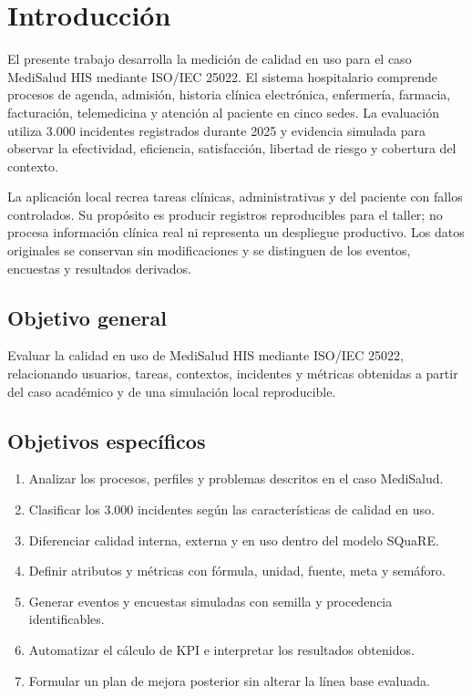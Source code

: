 \section{Introducción}

El presente trabajo desarrolla la medición de calidad en uso para el caso MediSalud HIS mediante ISO/IEC 25022. El sistema hospitalario comprende procesos de agenda, admisión, historia clínica electrónica, enfermería, farmacia, facturación, telemedicina y atención al paciente en cinco sedes. La evaluación utiliza 3.000 incidentes registrados durante 2025 y evidencia simulada para observar la efectividad, eficiencia, satisfacción, libertad de riesgo y cobertura del contexto.

La aplicación local recrea tareas clínicas, administrativas y del paciente con fallos controlados. Su propósito es producir registros reproducibles para el taller; no procesa información clínica real ni representa un despliegue productivo. Los datos originales se conservan sin modificaciones y se distinguen de los eventos, encuestas y resultados derivados.

\subsection{Objetivo general}

Evaluar la calidad en uso de MediSalud HIS mediante ISO/IEC 25022, relacionando usuarios, tareas, contextos, incidentes y métricas obtenidas a partir del caso académico y de una simulación local reproducible.

\subsection{Objetivos específicos}

\begin{enumerate}
  \item Analizar los procesos, perfiles y problemas descritos en el caso MediSalud.
  \item Clasificar los 3.000 incidentes según las características de calidad en uso.
  \item Diferenciar calidad interna, externa y en uso dentro del modelo SQuaRE.
  \item Definir atributos y métricas con fórmula, unidad, fuente, meta y semáforo.
  \item Generar eventos y encuestas simuladas con semilla y procedencia identificables.
  \item Automatizar el cálculo de KPI e interpretar los resultados obtenidos.
  \item Formular un plan de mejora posterior sin alterar la línea base evaluada.
\end{enumerate}
